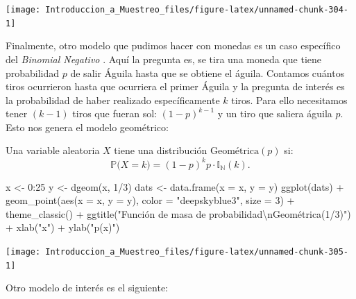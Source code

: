 \documentclass[
]{book}
\newenvironment{Shaded}{\begin{snugshade}}{\end{snugshade}}
\newcommand{\AttributeTok}[1]{\textcolor[rgb]{0.77,0.63,0.00}{#1}}
\newcommand{\DecValTok}[1]{\textcolor[rgb]{0.00,0.00,0.81}{#1}}
\newcommand{\FunctionTok}[1]{\textcolor[rgb]{0.00,0.00,0.00}{#1}}
\newcommand{\NormalTok}[1]{#1}
\newcommand{\OtherTok}[1]{\textcolor[rgb]{0.56,0.35,0.01}{#1}}
\newcommand{\SpecialCharTok}[1]{\textcolor[rgb]{0.00,0.00,0.00}{#1}}
\newcommand{\StringTok}[1]{\textcolor[rgb]{0.31,0.60,0.02}{#1}}
\begin{document}
\begin{center}\texttt{[image: Introduccion\_a\_Muestreo\_files/figure-latex/unnamed-chunk-304-1]} \end{center}

Finalmente, otro modelo que pudimos hacer con monedas es un caso específico del \emph{Binomial Negativo} . Aquí la pregunta es, se tira una moneda que tiene probabilidad \(p\) de salir Águila hasta que se obtiene el águila. Contamos cuántos tiros ocurrieron hasta que ocurriera el primer Águila y la pregunta de interés es la probabilidad de haber realizado específicamente \(k\) tiros. Para ello necesitamos tener \((k-1)\) tiros que fueran sol: \((1-p)^{k-1}\) y un tiro que saliera águila \(p\). Esto nos genera el modelo geométrico:

Una variable aleatoria \(X\) tiene una distribución \(\text{Geométrica}(p)\) si:
\[
\mathbb{P}\big(X = k \big) = (1-p)^k p \cdot \mathbb{I}_{\mathbb{N}}(k).
\]

\begin{Shaded}
\begin{Highlighting}[]
\NormalTok{x }\OtherTok{\textless{}{-}} \DecValTok{0}\SpecialCharTok{:}\DecValTok{25}
\NormalTok{y }\OtherTok{\textless{}{-}} \FunctionTok{dgeom}\NormalTok{(x, }\DecValTok{1}\SpecialCharTok{/}\DecValTok{3}\NormalTok{)}
\NormalTok{dats }\OtherTok{\textless{}{-}} \FunctionTok{data.frame}\NormalTok{(}\AttributeTok{x =}\NormalTok{ x, }\AttributeTok{y =}\NormalTok{ y)}
\FunctionTok{ggplot}\NormalTok{(dats) }\SpecialCharTok{+} \FunctionTok{geom\_point}\NormalTok{(}\FunctionTok{aes}\NormalTok{(}\AttributeTok{x =}\NormalTok{ x, }\AttributeTok{y =}\NormalTok{ y), }\AttributeTok{color =} \StringTok{"deepskyblue3"}\NormalTok{, }\AttributeTok{size =} \DecValTok{3}\NormalTok{) }\SpecialCharTok{+} \FunctionTok{theme\_classic}\NormalTok{() }\SpecialCharTok{+} \FunctionTok{ggtitle}\NormalTok{(}\StringTok{"Función de masa de probabilidad}\SpecialCharTok{\textbackslash{}n}\StringTok{Geométrica(1/3)"}\NormalTok{) }\SpecialCharTok{+}
  \FunctionTok{xlab}\NormalTok{(}\StringTok{"x"}\NormalTok{) }\SpecialCharTok{+} \FunctionTok{ylab}\NormalTok{(}\StringTok{"p(x)"}\NormalTok{)}
\end{Highlighting}
\end{Shaded}

\begin{center}\texttt{[image: Introduccion\_a\_Muestreo\_files/figure-latex/unnamed-chunk-305-1]} \end{center}

Otro modelo de interés es el siguiente:
\end{document}
